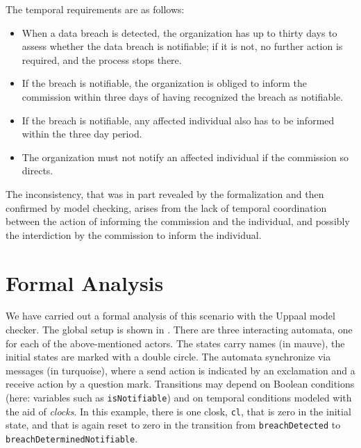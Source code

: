 The temporal requirements are as follows:
\begin{itemize}
\item When a data breach is detected, the organization has up to thirty days to
  assess whether the data breach is notifiable; if it is not, no further
  action is required, and the process stops there. 
\item If the breach is notifiable, the organization is obliged to inform the
  commission within three days of having recognized the breach as notifiable.
\item If the breach is notifiable, any affected individual also has to be
  informed within the three day period.
\item The organization must not notify an affected individual if the
  commission so directs.
\end{itemize}

The inconsistency, that was in part revealed by the formalization and then
confirmed by model checking, arises from the lack of temporal coordination
between the action of informing the commission and the individual, and
possibly the interdiction by the commission to inform the individual.


\section{Formal Analysis}\label{sec:formal_analysis}

We have carried out a formal analysis of this scenario with the Uppaal
\cite{larsen1997uppaal} model checker. The global setup is shown in
. There are three interacting automata, one for each of the
above-mentioned actors. The states carry names (in mauve), the initial states
are marked with a double circle. The automata synchronize via messages (in
turquoise), where a send action is indicated by an exclamation and a receive
action by a question mark. Transitions may depend on Boolean conditions (here:
variables such as \texttt{isNotifiable}) and on temporal conditions modeled
with the aid of \emph{clocks}. In this example, there is one closk,
\texttt{cl}, that is zero in the initial state, and that is again reset to
zero in the transition from \texttt{breachDetected} to \texttt{breachDeterminedNotifiable}.


